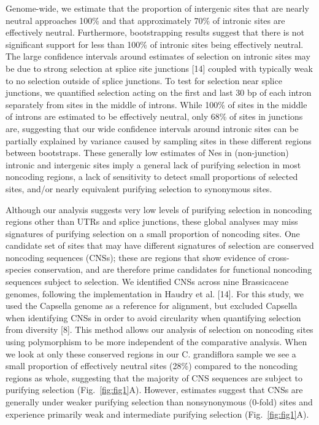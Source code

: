 Genome-wide, we estimate that the proportion of intergenic sites that are nearly neutral approaches 100\% and that approximately 70\% of intronic sites are effectively neutral. Furthermore, bootstrapping results suggest that there is not significant support for less than 100\% of intronic sites being effectively neutral. The large confidence intervals around estimates of selection on intronic sites may be due to strong selection at splice site junctions [14] coupled with typically weak to no selection outside of splice junctions. To test for selection near splice junctions, we quantified selection acting on the first and last 30 bp of each intron separately from sites in the middle of introns. While 100\% of sites in the middle of introns are estimated to be effectively neutral, only 68\% of sites in junctions are, suggesting that our wide confidence intervals around intronic sites can be partially explained by variance caused by sampling sites in these different regions between bootstraps. These generally low estimates of Nes in (non-junction) intronic and intergenic sites imply a general lack of purifying selection in most noncoding regions, a lack of sensitivity to detect small proportions of selected sites, and/or nearly equivalent purifying selection to synonymous sites. 

Although our analysis suggests very low levels of purifying selection in noncoding regions other than UTRs and splice junctions, these global analyses may miss signatures of purifying selection on a small proportion of noncoding sites. One candidate set of sites that may have different signatures of selection are conserved noncoding sequences (CNSs); these are regions that show evidence of cross-species conservation, and are therefore prime candidates for functional noncoding sequences subject to selection. We identified CNSs across nine Brassicaceae genomes, following the implementation in Haudry et al. [14]. For this study, we used the Capsella genome as a reference for alignment, but excluded Capsella when identifying CNSs in order to avoid circularity when quantifying selection from diversity [8]. This method allows our analysis of selection on noncoding sites using polymorphism to be more independent of the comparative analysis. When we look at only these conserved regions in our C. grandiflora sample we see a small proportion of effectively neutral sites (28\%) compared to the noncoding regions as whole, suggesting that the majority of CNS sequences are subject to purifying selection (Fig.~\ref{fig:fig1}A). However, estimates suggest that CNSs are generally under weaker purifying selection than nonsynonymous (0-fold) sites and experience primarily weak and intermediate purifying selection (Fig.~\ref{fig:fig1}A). 

